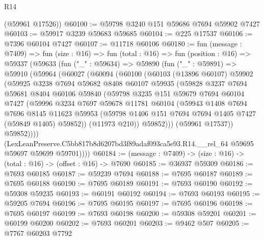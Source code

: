 \begin{lexlean}{R14}
\begin{coremodule}
      (@59961 @17526))
@60100 := @59798 @3240 @151 @59686 @7694 @59902 @7427
@60103 := @59917 @3239 @59683 @59685
@60104 := @225 @17537
@60106 := @7396 @60104 @7427
@60107 := @11718 @60106
@60180 := fun (message : @7409) =>
  fun (size : @16) =>
  fun (total : @16) =>
  fun (position : @16) =>
  @59337
    (@59633
      (fun ("_" : @59634) =>
      @59890
        (fun ("_" : @59891) =>
        @59910
          (@59964
            (@60027
              (@60094
                (@60100
                  (@60103
                    (@13896 @60107)
                    @59902
                    (@59925
                      @3238
                      @7694
                      @59682
                      @8408
                      @60107
                      @59935
                      (@59828
                        @3237
                        @7694
                        @59681
                        @8404
                        @60106
                        @59840
                        (@59798
                          @3235
                          @151
                          @59679
                          @7694
                          @60104
                          @7427
                          (@59996
                            @3234
                            @7697
                            @59678
                            @11781
                            @60104
                            (@59943
                              @1408
                              @7694
                              @7696
                              @8145
                              @11623
                              @59953
                              (@59798 @1406 @151 @7694 @7694 @1405 @7427 (@59849 @1405) @59852))
                            (@11973 @210))
                          @59852)))
                    (@59961 @17537))
                  @59852))))
          (LexLeanPreserve.C5bb817b8d6207bd3f89adaf093ca5e93.R14.__rel_64
            @59695
            @59697
            @59699
            @59701))))
@60184 := (message : @7409) -> (size : @16) -> (total : @16) -> (offset : @16) -> @7690
@60185 := @36937 @59309
@60186 := @7693 @60185
@60187 := @59239 @7694
@60188 := @7695 @60187
@60189 := @7695 @60188
@60190 := @7695 @60189
@60191 := @7693 @60190
@60192 := @59308 @59235
@60193 := @60191 @60192
@60194 := @7693 @60193
@60195 := @59205 @7694
@60196 := @7695 @60195
@60197 := @7695 @60196
@60198 := @7695 @60197
@60199 := @7693 @60198
@60200 := @59308 @59201
@60201 := @60199 @60200
@60202 := @7693 @60201
@60203 := @9462 @507
@60205 := @7767 @60203 @7792

\end{coremodule}
\end{lexlean}
